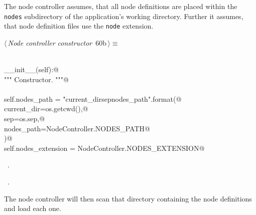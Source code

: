 \documentclass[
    a4paper,      %
    10pt,         %
    openright,    %
    notitlepage,  %
    parskip=half, %
]{scrreprt}       %
\theoremstyle{definition}                    %
\begin{document}
The node controller assumes, that all node definitions are placed within the
\verb+nodes+ subdirectory of the application's working directory. Further it
assumes, that node definition files use the \verb+node+ extension.

\begin{flushleft} \small
\begin{minipage}{\linewidth}\label{scrap98}\raggedright\small
{} $\langle\,${\itshape Node controller constructor}\nobreak\ {\footnotesize {60b}}$\,\rangle\equiv$
\vspace{-1exm}
\begin{list}{}{} \item
\mbox{}\lstinline@@\\
\mbox{}\lstinline@def __init__(self):@\\
\mbox{}\lstinline@    """ Constructor. """@\\
\mbox{}\lstinline@@\\
\mbox{}\lstinline@    self.nodes_path = "{current_dir}{sep}{nodes_path}".format(@\\
\mbox{}\lstinline@        current_dir=os.getcwd(),@\\
\mbox{}\lstinline@        sep=os.sep,@\\
\mbox{}\lstinline@        nodes_path=NodeController.NODES_PATH@\\
\mbox{}\lstinline@    )@\\
\mbox{}\lstinline@    self.nodes_extension = NodeController.NODES_EXTENSION@{\NWsep}
\end{list}
\vspace{-1.5ex}
\footnotesize
\begin{list}{}{\setlength{\itemsep}{-\parsep}\setlength{\itemindent}{-\leftmargin}}
\item \NWtxtMacroDefBy\ .
\item \NWtxtMacroRefIn\ .

\item{}
\end{list}
\end{minipage}\vspace{4ex}
\end{flushleft}
The node controller will then scan that directory containing the node
definitions and load each one.
\end{document}
